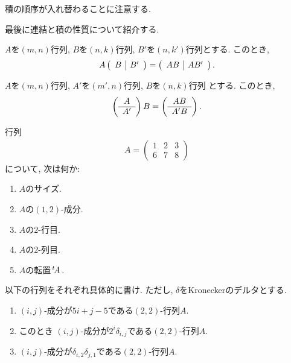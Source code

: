 \begin{remark}
  積の順序が入れ替わることに注意する.
\end{remark}


最後に連結と積の性質について紹介する.
\begin{prop}
  $A$を$(m,n)$行列,
  $B$を$(n,k)$行列,
  $B'$を$(n,k')$行列とする.
  このとき,
  \begin{align*}
    A\left(\begin{array}{c|c}B& B'\end{array}\right)
    =\left(\begin{array}{c|c}AB& AB'\end{array}\right).
  \end{align*}  
\end{prop}
\begin{prop}
  $A$を$(m,n)$行列,
  $A'$を$(m',n)$行列,
  $B$を$(n,k)$行列
  とする.
  このとき,
  \begin{align*}
    \left(\begin{array}{c}A\\\hline A'\end{array}\right)B
    =\left(\begin{array}{c}AB\\\hline A'B\end{array}\right).
  \end{align*}  
\end{prop}


\begin{quiz}
  行列 
  \begin{align*}
    A=
    \begin{pmatrix}
      1&2&3\\6&7&8
    \end{pmatrix}
  \end{align*}
  について, 次は何か:
  \begin{enumerate}
  \item $A$のサイズ.
  \item $A$の$(1,2)$-成分.
  \item $A$の$2$-行目.
  \item $A$の$2$-列目.
  \item $A$の転置${\left.^{t}\!A\right.}$.
  \end{enumerate}
\end{quiz}

\begin{quiz} 
  以下の行列をそれぞれ具体的に書け.
  ただし, $\delta$をKroneckerのデルタとする. 
  \begin{enumerate}
  \item $(i,j)$-成分が$5i+j-5$である$(2,2)$-行列$A$.
  \item このとき
    $(i,j)$-成分が$2^i\delta_{i,j}$である$(2,2)$-行列$A$.
  \item
    $(i,j)$-成分が$\delta_{i,2}\delta_{j,1}$である$(2,2)$-行列$A$.
  \end{enumerate}
\end{quiz}

